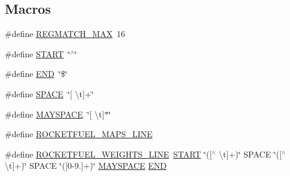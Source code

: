 \subsection*{Macros}
\begin{DoxyCompactItemize}
\item 
\#define \hyperlink{rocketfuel-topology-reader_8cc_a6060444660288a903075761dcfcb32d3}{R\+E\+G\+M\+A\+T\+C\+H\+\_\+\+M\+AX}~16
\item 
\#define \hyperlink{rocketfuel-topology-reader_8cc_a3018c7600b7bb9866400596a56a57af7}{S\+T\+A\+RT}~\char`\"{}$^\wedge$\char`\"{}
\item 
\#define \hyperlink{rocketfuel-topology-reader_8cc_a29fd18bed01c4d836c7ebfe73a125c3f}{E\+ND}~\char`\"{}\$\char`\"{}
\item 
\#define \hyperlink{rocketfuel-topology-reader_8cc_a5ff6e798033f03e74730e99f01936f84}{S\+P\+A\+CE}~\char`\"{}\mbox{[} \textbackslash{}t\mbox{]}+\char`\"{}
\item 
\#define \hyperlink{rocketfuel-topology-reader_8cc_a35748b428d56da2e93f4f4c9d0cba87c}{M\+A\+Y\+S\+P\+A\+CE}~\char`\"{}\mbox{[} \textbackslash{}t\mbox{]}$\ast$\char`\"{}
\item 
\#define \hyperlink{rocketfuel-topology-reader_8cc_a158bb886cca27e42e534b4a16a6a4f35}{R\+O\+C\+K\+E\+T\+F\+U\+E\+L\+\_\+\+M\+A\+P\+S\+\_\+\+L\+I\+NE}
\item 
\#define \hyperlink{rocketfuel-topology-reader_8cc_a3bc3a698d16d454a03f538d762f6a295}{R\+O\+C\+K\+E\+T\+F\+U\+E\+L\+\_\+\+W\+E\+I\+G\+H\+T\+S\+\_\+\+L\+I\+NE}~\hyperlink{rocketfuel-topology-reader_8cc_a3018c7600b7bb9866400596a56a57af7}{S\+T\+A\+RT} \char`\"{}(\mbox{[}$^\wedge$ \textbackslash{}t\mbox{]}+)\char`\"{} S\+P\+A\+CE \char`\"{}(\mbox{[}$^\wedge$ \textbackslash{}t\mbox{]}+)\char`\"{} S\+P\+A\+CE \char`\"{}(\mbox{[}0-\/9.\mbox{]}+)\char`\"{} \hyperlink{rocketfuel-topology-reader_8cc_a35748b428d56da2e93f4f4c9d0cba87c}{M\+A\+Y\+S\+P\+A\+CE} \hyperlink{rocketfuel-topology-reader_8cc_a29fd18bed01c4d836c7ebfe73a125c3f}{E\+ND}
\end{DoxyCompactItemize}
